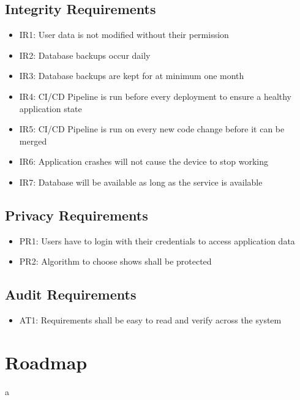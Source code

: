 \documentclass[12pt]{article}
\begin{document}
\subsection{Integrity Requirements}
\begin{itemize}
	\item IR1: User data is not modified without their permission
	\item IR2: Database backups occur daily
	\item IR3: Database backups are kept for at minimum one month
	\item IR4: CI/CD Pipeline is run before every deployment to ensure a healthy application state
	\item IR5: CI/CD Pipeline is run on every new code change before it can be merged
	\item IR6: Application crashes will not cause the device to stop working
	\item IR7: Database will be available as long as the service is available
\end{itemize}

\subsection{Privacy Requirements}
\begin{itemize}
	\item PR1: Users have to login with their credentials to access application data
	\item PR2: Algorithm to choose shows shall be protected
\end{itemize}

\subsection{Audit Requirements}
\begin{itemize}
	\item AT1: Requirements shall be easy to read and verify across the system
\end{itemize}

\section{Roadmap}
a
\end{document}
